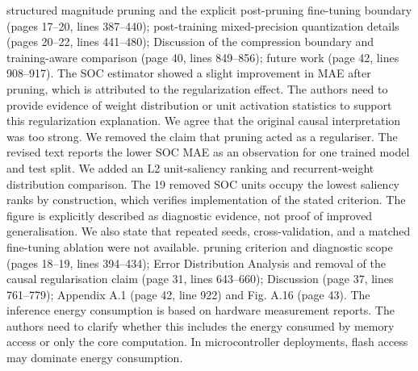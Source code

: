 {} structured magnitude pruning and the explicit post-pruning fine-tuning boundary (pages 17--20, lines 387--440); post-training mixed-precision quantization details (pages 20--22, lines 441--480); Discussion of the compression boundary and training-aware comparison (page 40, lines 849--856); future work (page 42, lines 908--917).\markdownRendererInterblockSeparator
{}
\markdownRendererSectionEnd \markdownRendererSectionBegin
{}\markdownRendererInterblockSeparator
{}\markdownRendererBlockQuoteBegin
The SOC estimator showed a slight improvement in MAE after pruning, which is attributed to the regularization effect. The authors need to provide evidence of weight distribution or unit activation statistics to support this regularization explanation.\markdownRendererBlockQuoteEnd \markdownRendererInterblockSeparator
{} We agree that the original causal interpretation was too strong. We removed the claim that pruning acted as a regulariser. The revised text reports the lower SOC MAE as an observation for one trained model and test split. We added an L2 unit-saliency ranking and recurrent-weight distribution comparison. The 19 removed SOC units occupy the lowest saliency ranks by construction, which verifies implementation of the stated criterion. The figure is explicitly described as diagnostic evidence, not proof of improved generalisation. We also state that repeated seeds, cross-validation, and a matched fine-tuning ablation were not available.\markdownRendererParagraphSeparator
{} pruning criterion and diagnostic scope (pages 18--19, lines 394--434); Error Distribution Analysis and removal of the causal regularisation claim (page 31, lines 643--660); Discussion (page 37, lines 761--779); Appendix A.1 (page 42, line 922) and Fig. A.16 (page 43).\markdownRendererInterblockSeparator
{}
\markdownRendererSectionEnd \markdownRendererSectionBegin
{}\markdownRendererInterblockSeparator
{}\markdownRendererBlockQuoteBegin
The inference energy consumption is based on hardware measurement reports. The authors need to clarify whether this includes the energy consumed by memory access or only the core computation. In microcontroller deployments, flash access may dominate energy consumption.\markdownRendererBlockQuoteEnd \markdownRendererInterblockSeparator
